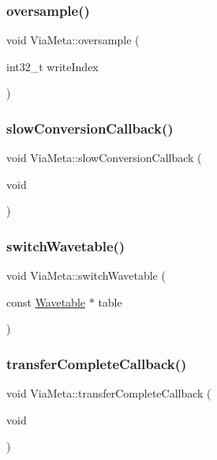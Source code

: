 \subsubsection{\texorpdfstring{oversample()}{oversample()}}
{\footnotesize\ttfamily void Via\+Meta\+::oversample (\begin{DoxyParamCaption}\item[{int32\+\_\+t}]{write\+Index }\end{DoxyParamCaption})}

\mbox{\label{class_via_meta_a78d563d212d841e5aa73c3207b558f05}} 
\subsubsection{\texorpdfstring{slow\+Conversion\+Callback()}{slowConversionCallback()}}
{\footnotesize\ttfamily void Via\+Meta\+::slow\+Conversion\+Callback (\begin{DoxyParamCaption}\item[{void}]{ }\end{DoxyParamCaption})}

\mbox{\label{class_via_meta_a46bc714c10dfcb4f6900ad0518ecbf51}} 
\subsubsection{\texorpdfstring{switch\+Wavetable()}{switchWavetable()}}
{\footnotesize\ttfamily void Via\+Meta\+::switch\+Wavetable (\begin{DoxyParamCaption}\item[{const \mbox{\hyperlink{struct_wavetable}{Wavetable}} $\ast$}]{table }\end{DoxyParamCaption})}

\mbox{\label{class_via_meta_a3c6be30783cfeb8fbb2954579fd772a6}} 
\subsubsection{\texorpdfstring{transfer\+Complete\+Callback()}{transferCompleteCallback()}}
{\footnotesize\ttfamily void Via\+Meta\+::transfer\+Complete\+Callback (\begin{DoxyParamCaption}\item[{void}]{ }\end{DoxyParamCaption})}

